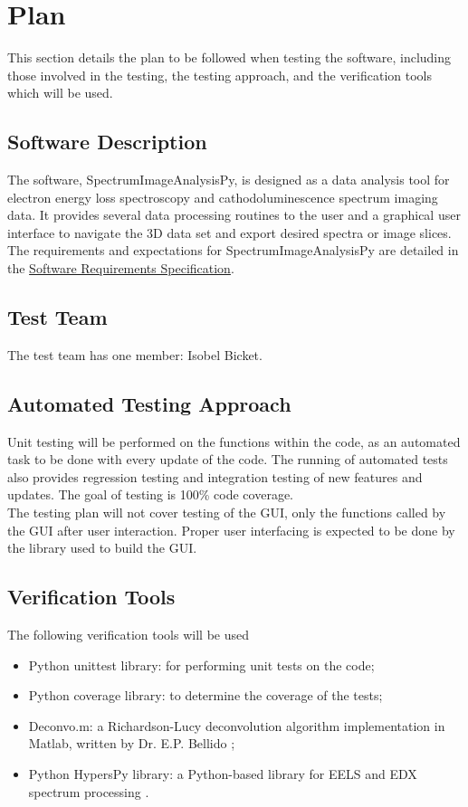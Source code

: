 \documentclass[12pt, titlepage]{article}
\newcommand{\progname}{SpectrumImageAnalysisPy}
\begin{document}
\section{Plan}
This section details the plan to be followed when testing the software, including those involved in the testing, the testing approach, and the verification tools which will be used.
	
\subsection{Software Description}
The software, \progname{}, is designed as a data analysis tool for electron energy loss spectroscopy and cathodoluminescence spectrum imaging data. It provides several data processing routines to the user and a graphical user interface to navigate the 3D data set and export desired spectra or image slices. The requirements and expectations for \progname{} are detailed in the \hyperref[doc:SRS]{Software Requirements Specification}.

\subsection{Test Team}
The test team has one member: Isobel Bicket.

\subsection{Automated Testing Approach}

Unit testing will be performed on the functions within the code, as an automated task to be done with every update of the code. The running of automated tests also provides regression testing and integration testing of new features and updates. The goal of testing is 100\% code coverage.\\
The testing plan will not cover testing of the GUI, only the functions called by the GUI after user interaction. Proper user interfacing is expected to be done by the library used to build the GUI.\\

\subsection{Verification Tools}

The following verification tools will be used
\begin{itemize}
	\item Python unittest library: for performing unit tests on the code;
	\item Python coverage library: to determine the coverage of the tests;
	\item Deconvo.m: a Richardson-Lucy deconvolution algorithm implementation in Matlab, written by Dr. E.P. Bellido \cite{bellido_toward_2014};
	\item Python HypersPy library: a Python-based library for EELS and EDX spectrum processing \cite{francisco_de_la_pena_2017_583693}.
\end{itemize}
\end{document}
